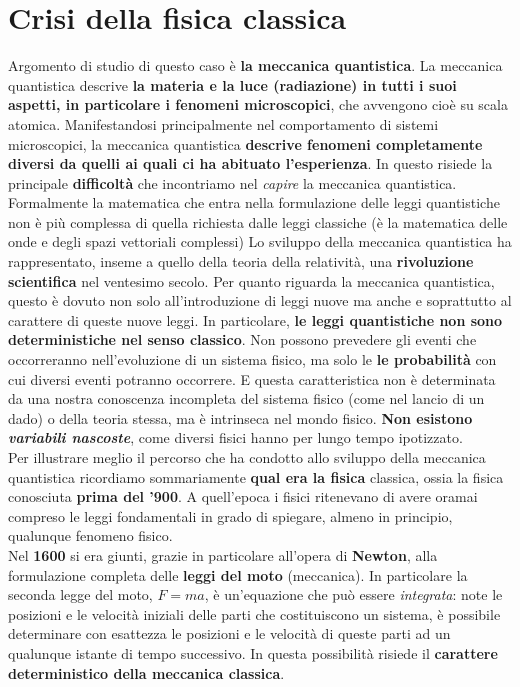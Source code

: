 \chapter{Crisi della fisica classica}
Argomento di studio di questo caso è \textbf{la meccanica quantistica}.
La meccanica quantistica descrive \textbf{la materia e la luce (radiazione) in tutti i suoi aspetti, in particolare i fenomeni microscopici}, che avvengono cioè su scala atomica.
Manifestandosi principalmente nel comportamento di sistemi microscopici, la meccanica quantistica \textbf{descrive fenomeni completamente diversi da quelli ai quali ci ha abituato l'esperienza}. In questo risiede la principale \textbf{difficoltà} che incontriamo nel \textit{capire} la meccanica quantistica. Formalmente la matematica che entra nella formulazione delle leggi quantistiche non è più complessa di quella richiesta dalle leggi classiche (è la matematica delle onde e degli spazi vettoriali complessi)
Lo sviluppo della meccanica quantistica ha rappresentato, inseme a quello della teoria della relatività, una \textbf{rivoluzione scientifica} nel ventesimo secolo. Per quanto riguarda la meccanica quantistica, questo è dovuto non solo all'introduzione di leggi nuove ma anche e soprattutto al carattere di queste nuove leggi. In particolare, \textbf{le leggi quantistiche non sono deterministiche nel senso classico}. Non possono prevedere gli eventi che occorreranno nell'evoluzione di un sistema fisico, ma solo le \textbf{le probabilità} con cui diversi eventi potranno occorrere. E questa caratteristica non è determinata da una nostra conoscenza incompleta del sistema fisico (come nel lancio di un dado) o della teoria stessa, ma è intrinseca nel mondo fisico. \textbf{Non esistono \textit{variabili nascoste}}, come diversi fisici hanno per lungo tempo ipotizzato.\\
Per illustrare meglio il percorso che ha condotto allo sviluppo della meccanica quantistica ricordiamo sommariamente \textbf{qual era la fisica} classica, ossia la fisica conosciuta \textbf{prima del '900}.  A quell'epoca i fisici ritenevano di avere oramai compreso le leggi fondamentali in grado di spiegare, almeno in principio, qualunque fenomeno fisico.\\
Nel \textbf{1600} si era giunti, grazie in particolare all'opera di \textbf{Newton}, alla formulazione completa delle \textbf{leggi del moto} (meccanica). In particolare la seconda legge del moto, $F=ma$, è un'equazione che può essere \textit{integrata}: note le posizioni e le velocità iniziali delle parti che costituiscono un sistema, è possibile determinare con esattezza le posizioni e le velocità di queste parti ad un qualunque istante di tempo successivo. In questa possibilità risiede il \textbf{carattere deterministico della meccanica classica}.\\
